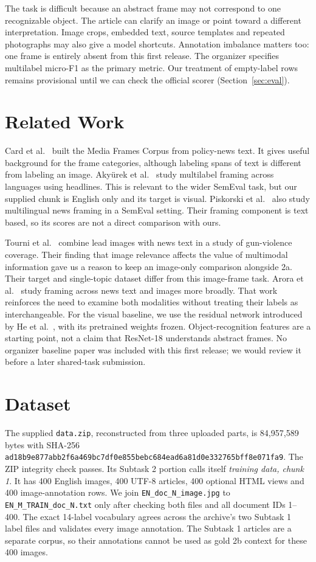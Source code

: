 \documentclass[11pt]{article}
\begin{document}
The task is difficult because an abstract frame may not correspond to one recognizable object. The article can clarify an image or point toward a different interpretation. Image crops, embedded text, source templates and repeated photographs may also give a model shortcuts. Annotation imbalance matters too: one frame is entirely absent from this first release. The organizer specifies multilabel micro-F1 as the primary metric. Our treatment of empty-label rows remains provisional until we can check the official scorer (Section~\ref{sec:eval}).

\section{Related Work}\label{sec:related}
Card et al.~\cite{card2015} built the Media Frames Corpus from policy-news text. It gives useful background for the frame categories, although labeling spans of text is different from labeling an image. Aky\"urek et al.~\cite{akyurek2020} study multilabel framing across languages using headlines. This is relevant to the wider SemEval task, but our supplied chunk is English only and its target is visual. Piskorski et al.~\cite{piskorski2023} also study multilingual news framing in a SemEval setting. Their framing component is text based, so its scores are not a direct comparison with ours.

Tourni et al.~\cite{tourni2021} combine lead images with news text in a study of gun-violence coverage. Their finding that image relevance affects the value of multimodal information gave us a reason to keep an image-only comparison alongside 2a. Their target and single-topic dataset differ from this image-frame task. Arora et al.~\cite{arora2025} study framing across news text and images more broadly. That work reinforces the need to examine both modalities without treating their labels as interchangeable. For the visual baseline, we use the residual network introduced by He et al.~\cite{he2016}, with its pretrained weights frozen. Object-recognition features are a starting point, not a claim that ResNet-18 understands abstract frames. No organizer baseline paper was included with this first release; we would review it before a later shared-task submission.

\section{Dataset}\label{sec:data}
The supplied \texttt{data.zip}, reconstructed from three uploaded parts, is 84,957,589 bytes with SHA-256 \texttt{ad18b9e877abb2f6a469bc7df0e855bebc684ead6a81d0e332765bff8e071fa9}. The ZIP integrity check passes. Its Subtask 2 portion calls itself \emph{training data, chunk 1}. It has 400 English images, 400 UTF-8 articles, 400 optional HTML views and 400 image-annotation rows. We join \texttt{EN\_doc\_N\_image.jpg} to \texttt{EN\_M\_TRAIN\_doc\_N.txt} only after checking both files and all document IDs 1--400. The exact 14-label vocabulary agrees across the archive's two Subtask 1 label files and validates every image annotation. The Subtask 1 articles are a separate corpus, so their annotations cannot be used as gold 2b context for these 400 images.
\end{document}
